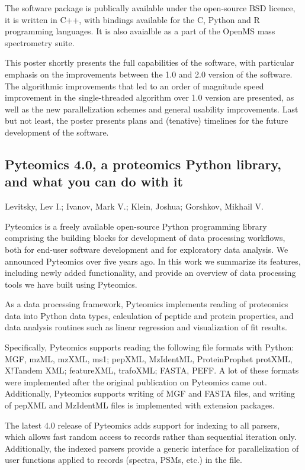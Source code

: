 {The software package is publically available under the open-source BSD licence, it is written in C++, with bindings available for the C, Python and R programming languages. It is also avaialble as a part of the OpenMS mass spectrometry suite.

This poster shortly presents the full capabilities of the software, with particular emphasis on the improvements between the 1.0 and 2.0 version of the software. The algorithmic improvements that led to an order of magnitude speed improvement in the single-threaded algorithm over 1.0 version are presented, as well as the new parallelization schemes and general usability improvements. Last but not least, the poster presents plans and (tenative) timelines for the future development of the software.


\subsection*{\color{eubicRed} Pyteomics 4.0, a proteomics Python library, and what you can do with it}
{\color{eubicGray}Levitsky, Lev I.;
Ivanov, Mark V.;
Klein, Joshua;
Gorshkov, Mikhail V.}

Pyteomics is a freely available open-source Python programming library comprising the building blocks for development of data processing workflows, both for end-user software development and for exploratory data analysis. We announced Pyteomics over five years ago. In this work we summarize its features, including newly added functionality, and provide an overview of data processing tools we have built using Pyteomics.

As a data processing framework, Pyteomics implements reading of proteomics data into Python data types, calculation of peptide and protein properties, and data analysis routines such as linear regression and visualization of fit results.

Specifically, Pyteomics supports reading the following file formats with Python: MGF, mzML, mzXML, ms1; pepXML, MzIdentML, ProteinProphet protXML, X!Tandem XML; featureXML, trafoXML; FASTA, PEFF. A lot of these formats were implemented after the original publication on Pyteomics came out. Additionally, Pyteomics supports writing of MGF and FASTA files, and writing of pepXML and MzIdentML files is implemented with extension packages.

The latest 4.0 release of Pyteomics adds support for indexing to all parsers, which allows fast random access to records rather than sequential iteration only. Additionally, the indexed parsers provide a generic interface for parallelization of user functions applied to records (spectra, PSMs, etc.) in the file.

}
